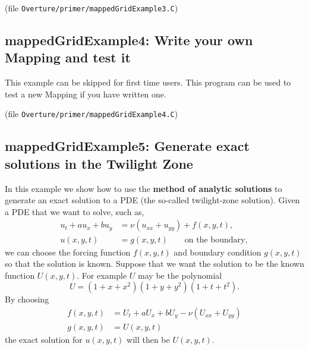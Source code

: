 \documentclass{article}
\begin{document}
(file {\tt Overture/primer/mappedGridExample3.C})
{\footnotesize
{}
}

% 
% 

\vfill\eject
\subsection{mappedGridExample4: Write your own Mapping and test it}

This example can be skipped for first time users.
This program can be used to test a new Mapping if you have written one. 


(file {\tt Overture/primer/mappedGridExample4.C})
{\footnotesize
{}
}

\vfill\eject
\subsection{mappedGridExample5: Generate exact solutions in the Twilight Zone}

In this example we show how to use the {\bf method of analytic solutions} to generate
an exact solution to a PDE (the so-called twilight-zone solution). 
Given a PDE that we want to solve, such as,
\begin{align*}
    u_t + a u_x + b u_y & = \nu( u_{xx} + u_{yy} ) + f(x,y,t), \\
        u(x,y,t) & = g(x,y,t)    \qquad \text{on the boundary},
\end{align*}
we can choose the forcing function $f(x,y,t)$ and boundary condition $g(x,y,t)$
so that the solution is known. Suppose
that we want the solution to be the known function $U(x,y,t)$. For example $U$ may
be the polynomial
\[
 U=(1+x+x^2)(1+y+y^2)(1+t+t^2).
\]
By choosing
\begin{align*}
   f(x,y,t) & = U_t + a U_x + b U_y - \nu( U_{xx} + U_{yy} ) \\
   g(x,y,t) &= U(x,y,t)
\end{align*}
the exact solution for $u(x,y,t)$ will then be $U(x,y,t)$.
 
\end{document}
